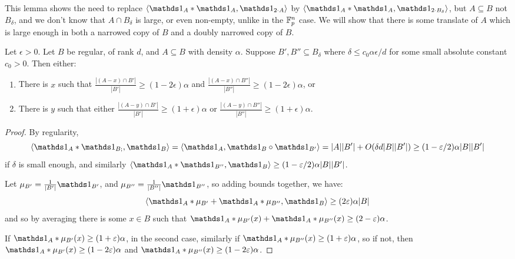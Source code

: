 \documentclass[10pt,a4paper]{article}
\begin{document}
This lemma shows the need to replace $\angle{\one_A\ast \one_A, \one_{2\cdot A}}$ by $\angle{\one_A\ast \one_A, \one_{2\cdot B_\delta}}$, but $A \subseteq B$ not $B_\delta$, and we don't know that $A \cap B_\delta$ is large, or even non-empty, unlike in the $\mathbb{F}_p^n$ case. We will show that there is some translate of $A$ which is large enough in both a narrowed copy of $B$ and a doubly narrowed copy of $B$.
\begin{lemma}
  Let $\epsilon >0$. Let $B$ be regular, of rank $d$, and $A \subseteq B$ with density $\alpha$. Suppose $B', B''\subseteq B_\delta$ where $\delta \leq c_0 \alpha\epsilon/d$ for some small absolute constant $c_0 >0$. Then either:
  \begin{enumerate}
    \item There is $x$ such that $\frac{|(A-x)\cap B'|}{|B'|}\geq (1-2\epsilon)\alpha$ and $\frac{|(A-x)\cap B''|}{|B''|} \geq (1-2\epsilon)\alpha$, or
    \item There is $y$ such that either $\frac{|(A-y)\cap B'|}{|B'|} \geq (1+\epsilon)\alpha$ or $\frac{|(A-y)\cap B''|}{|B''|} \geq (1+\epsilon)\alpha$.
  \end{enumerate}
\end{lemma}
\begin{proof}
  By regularity,
  \[\angle{\one_A \ast \one_{B;}, \one_B} = \angle{\one_A, \one_B\circ \one_{B'}} = |A||B'| + O(\delta d |B||B'|) \geq (1-\epsilon/2)\alpha|B||B'|\]
  if $\delta$ is small enough, and similarly $\angle{\one_A \ast \one_{B''}, \one_B} \geq (1-\epsilon/2)\alpha|B||B'|$.

  Let $\mu_{B'} = \frac{1}{|B'|}\one_{B'}$, and $\mu_{B''} = \frac{1}{|B''|}\one_{B''}$, so adding bounds together, we have:
  \[ \angle{\one_A \ast \mu_{B'} + \one_A \ast \mu_{B''}, \one_B} \geq (2\epsilon) \alpha |B|\]
  and so by averaging there is some $x \in B$ such that $\one_A \ast \mu_{B'}(x) + \one_A\ast \mu_{B''}(x) \geq (2-\epsilon)\alpha$.

  If $\one_A\ast \mu_{B'}(x) \geq (1+\epsilon)\alpha$, in the second case, similarly if $\one_A \ast \mu_{B''}(x) \geq (1+\epsilon)\alpha$, so if not, then $\one_A \ast \mu_{B'}(x) \geq (1-2\epsilon)\alpha$ and $\one_A \ast \mu_{B''}(x) \geq (1-2\epsilon)\alpha$.
\end{proof}
\end{document}
